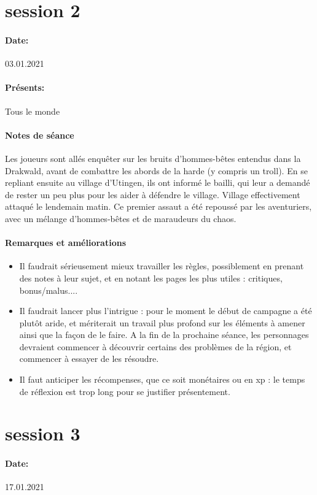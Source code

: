\documentclass[10pt,a4paper]{book}
\begin{document}
\section{session 2}
\paragraph{Date:} 03.01.2021
\paragraph{Présents:}Tous le monde
\paragraph{Notes de séance}
Les joueurs sont allés enquêter sur les bruits d'hommes-bêtes entendus dans la Drakwald, avant de combattre les abords de la harde (y compris un troll). En se repliant ensuite au village d'Utingen, ils ont informé le bailli, qui leur a demandé de rester un peu plus pour les aider à défendre le village. Village effectivement attaqué le lendemain matin. Ce premier assaut a été repoussé par les aventuriers, avec un mélange d'hommes-bêtes et de maraudeurs du chaos.
\paragraph{Remarques et améliorations}
\begin{itemize}
\item Il faudrait sérieusement mieux travailler les règles, possiblement en prenant des notes à leur sujet, et en notant les pages les plus utiles : critiques, bonus/malus....
\item Il faudrait lancer plus l'intrigue : pour le moment le début de campagne a été plutôt aride, et mériterait un travail plus profond sur les éléments à amener ainsi que la façon de le faire. A la fin de la prochaine séance, les personnages devraient commencer à découvrir certains des problèmes de la région, et commencer à essayer de les résoudre.
\item Il faut anticiper les récompenses, que ce soit monétaires ou en xp : le temps de réflexion est trop long pour se justifier présentement.
\end{itemize}
\section{session 3}
\paragraph{Date:} 17.01.2021
\end{document}
